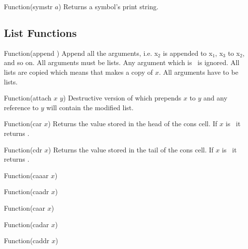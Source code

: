 \begin{defun}{Function}{(symstr $a$)}
  Returns a symbol's print string.
\end{defun}

\subsection{List Functions}

\begin{defun}{Function}{(append \xargs)}
  Append all the arguments, i.e. x$_{2}$ is appended to x$_{1}$,
  x$_{3}$ to x$_{2}$, and so on. All arguments must be lists. Any
  argument which is \NIL\ is ignored. All lists are copied which means
  that  makes a copy of $x$. All arguments have to be
  lists.

\end{defun}

\begin{defun}{Function}{(attach $x$ $y$)}
  Destructive version of  which prepends $x$ to $y$ and any
  reference to $y$ will contain the modified list.
\end{defun}

\begin{defun}{Function}{(car $x$)}
  Returns the value stored in the head of the cons cell. If $x$ is
  \NIL\ it returns \NIL.
\end{defun}

\begin{defun}{Function}{(cdr $x$)}
  Returns the value stored in the tail of the cons cell. If $x$ is
  \NIL\ it returns \NIL.
\end{defun}


\begin{defun}{Function}{(caaar $x$)}
\end{defun}

\begin{defun}{Function}{(caadr $x$)}
\end{defun}

\begin{defun}{Function}{(caar $x$)}
\end{defun}

\begin{defun}{Function}{(cadar $x$)}
\end{defun}

\begin{defun}{Function}{(caddr $x$)}
\end{defun}

